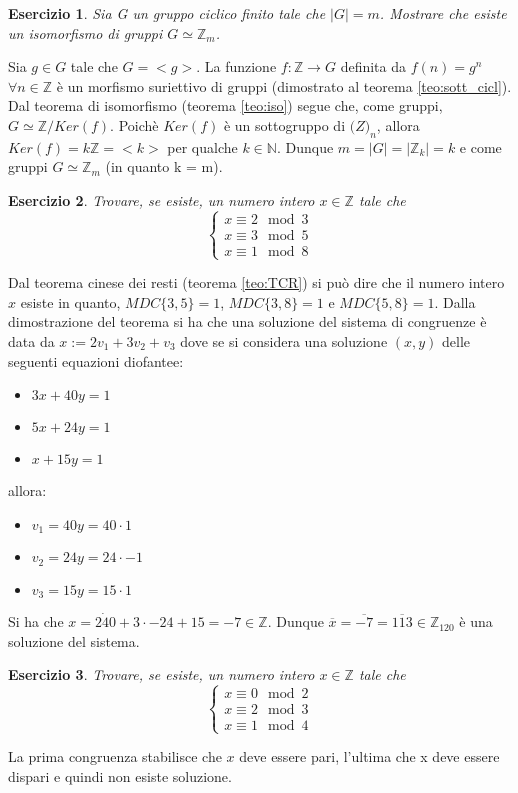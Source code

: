 \documentclass{article}
\theoremstyle{definition}
\theoremstyle{plain}
\theoremstyle{plain}
\theoremstyle{plain}
\theoremstyle{plain}
\newtheorem{esercizio}{Esercizio}
\begin{document}
\begin{esercizio}
    Sia G un gruppo ciclico finito tale che $|G| = m$. Mostrare che esiste un isomorfismo di gruppi $G \simeq \mathbb{Z}_m$.
\end{esercizio}
Sia $g \in G$ tale che $G = <g>$. La funzione $f: \mathbb{Z} \rightarrow G$ definita da $f(n) = g^n$ $\forall n \in \mathbb{Z}$ è un morfismo suriettivo di gruppi (dimostrato al teorema \ref{teo:sott_cicl}). \\
Dal teorema di isomorfismo (teorema \ref{teo:iso}) segue che, come gruppi, $G \simeq \mathbb{Z}/Ker(f)$. Poichè $Ker(f)$ è un sottogruppo di $\mathbb(Z)_n$, allora $Ker(f) = k \mathbb{Z} = <k>$ per qualche $k \in \mathbb{N}$. Dunque $m = |G| = |\mathbb{Z}_k| = k$ e come gruppi $G \simeq \mathbb{Z}_m$ (in quanto k = m). 

\begin{esercizio}
    Trovare, se esiste, un numero intero $x \in \mathbb{Z}$ tale che
    $$
        \begin{cases}
            x \equiv 2 \mod 3 \\
            x \equiv 3 \mod 5 \\
            x \equiv 1 \mod 8 
        \end{cases}
    $$  
\end{esercizio}
Dal teorema cinese dei resti (teorema \ref{teo:TCR}) si può dire che il numero intero $x$ esiste in quanto, $MDC\{3, 5\} = 1$, $MDC\{3, 8\} = 1$ e $MDC\{5, 8\} = 1$.
Dalla dimostrazione del teorema si ha che una soluzione del sistema di congruenze è data da $x := 2v_1 + 3v_2 + v_3$ dove se si considera una soluzione $(x, y)$ delle seguenti equazioni diofantee:
\begin{itemize}
    \item $3x + 40y = 1$
    \item $5x + 24y = 1$
    \item $x + 15y = 1$
\end{itemize}
allora:
\begin{itemize}
    \item $v_1 = 40y = 40 \cdot 1$
    \item $v_2 = 24y = 24 \cdot -1$
    \item $v_3 = 15y = 15 \cdot 1$
\end{itemize}
Si ha che $x = 2 \dot 40 + 3 \cdot -24 + 15 = -7 \in \mathbb{Z}$. Dunque $\overline{x} = \overline{-7} = \overline{113} \in \mathbb{Z}_{120}$ è una soluzione del sistema.

\begin{esercizio}
    Trovare, se esiste, un numero intero $x \in \mathbb{Z}$ tale che
    $$
        \begin{cases}
            x \equiv 0 \mod 2 \\
            x \equiv 2 \mod 3 \\
            x \equiv 1 \mod 4 
        \end{cases}
    $$  
\end{esercizio}
La prima congruenza stabilisce che $x$ deve essere pari, l'ultima che x deve essere dispari e quindi non esiste soluzione.
\end{document}
